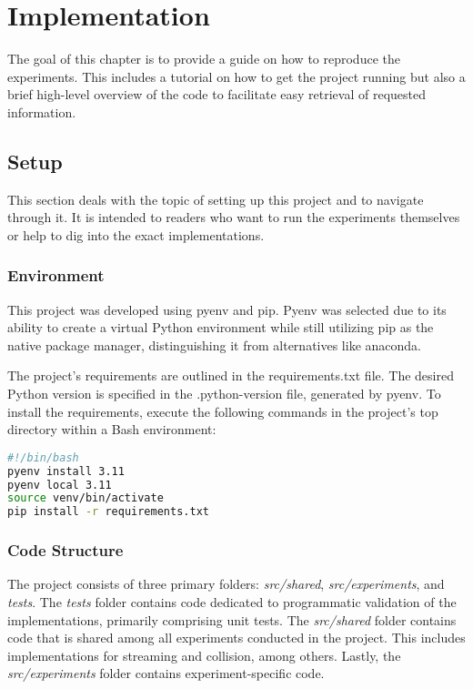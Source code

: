 \chapter{Implementation}\label{ch:implementation}
The goal of this chapter is to provide a guide on how to reproduce the experiments.
This includes a tutorial on how to get the project running but also a brief high-level overview of the code to facilitate easy retrieval of requested information.


\section{Setup}
This section deals with the topic of setting up this project and to navigate through it.
It is intended to readers who want to run the experiments themselves or help to dig into the exact implementations.

\subsection{Environment}
This project was developed using pyenv and pip.
Pyenv was selected due to its ability to create a virtual Python environment while still utilizing pip as the native package manager, distinguishing it from alternatives like anaconda.
\newline

The project's requirements are outlined in the requirements.txt file.
The desired Python version is specified in the .python-version file, generated by pyenv.
To install the requirements, execute the following commands in the project's top directory within a Bash environment:

\begin{center}
    \begin{lstlisting}[language=bash]
#!/bin/bash
pyenv install 3.11
pyenv local 3.11
source venv/bin/activate
pip install -r requirements.txt
    \end{lstlisting}
\end{center}

\subsection{Code Structure}
The project consists of three primary folders: \textit{src/shared}, \textit{src/experiments}, and \textit{tests}.
The \textit{tests} folder contains code dedicated to programmatic validation of the implementations, primarily comprising unit tests.
The \textit{src/shared} folder contains code that is shared among all experiments conducted in the project.
This includes implementations for streaming and collision, among others.
Lastly, the \textit{src/experiments} folder contains experiment-specific code.


